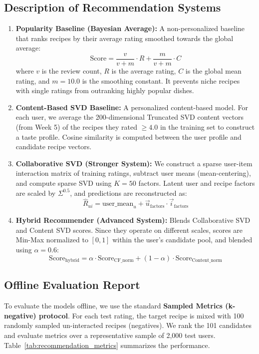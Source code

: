 \documentclass[11pt,a4paper]{article}
\begin{document}
\subsection{Description of Recommendation Systems}

\begin{enumerate}
    \item \textbf{Popularity Baseline (Bayesian Average):} A non-personalized baseline that ranks recipes by their average rating smoothed towards the global average:
    \[ \text{Score} = \frac{v}{v+m} \cdot R + \frac{m}{v+m} \cdot C \]
    where $v$ is the review count, $R$ is the average rating, $C$ is the global mean rating, and $m=10.0$ is the smoothing constant. It prevents niche recipes with single ratings from outranking highly popular dishes.
    
    \item \textbf{Content-Based SVD Baseline:} A personalized content-based model. For each user, we average the 200-dimensional Truncated SVD content vectors (from Week 5) of the recipes they rated $\ge 4.0$ in the training set to construct a taste profile. Cosine similarity is computed between the user profile and candidate recipe vectors.
    
    \item \textbf{Collaborative SVD (Stronger System):} We construct a sparse user-item interaction matrix of training ratings, subtract user means (mean-centering), and compute sparse SVD using $K=50$ factors. Latent user and recipe factors are scaled by $\Sigma^{0.5}$, and predictions are reconstructed as:
    \[ \hat{R}_{ui} = \text{user\_mean}_u + \vec{u}_{\text{factors}} \cdot \vec{i}_{\text{factors}} \]
    
    \item \textbf{Hybrid Recommender (Advanced System):} Blends Collaborative SVD and Content SVD scores. Since they operate on different scales, scores are Min-Max normalized to $[0, 1]$ within the user's candidate pool, and blended using $\alpha = 0.6$:
    \[ \text{Score}_{\text{hybrid}} = \alpha \cdot \text{Score}_{\text{CF\_norm}} + (1-\alpha) \cdot \text{Score}_{\text{Content\_norm}} \]
\end{enumerate}

\subsection{Offline Evaluation Report}
To evaluate the models offline, we use the standard \textbf{Sampled Metrics (k-negative) protocol}. For each test rating, the target recipe is mixed with 100 randomly sampled un-interacted recipes (negatives). We rank the 101 candidates and evaluate metrics over a representative sample of 2,000 test users. Table~\ref{tab:recommendation_metrics} summarizes the performance.
\end{document}

